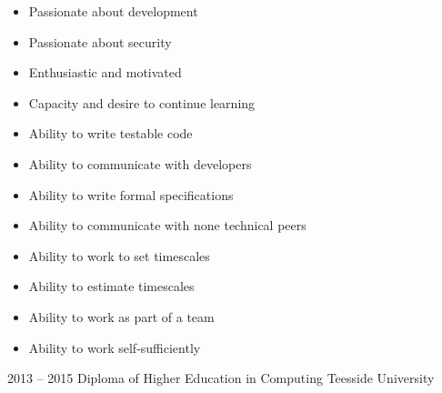 \documentclass[9pt]{developercv} %
\begin{document}
\begin{minipage}[t]{0.5\textwidth} %
    \vspace{-\baselineskip} %
    \vspace{10mm}
    \begin{itemize}
        \item Passionate about development
        \item Passionate about security
        \item Enthusiastic and motivated 
        \item Capacity and desire to continue learning
        \item Ability to write testable code
        \item Ability to communicate with developers
    \end{itemize}
\end{minipage}
\begin{minipage}[t]{0.5\textwidth} %
    \vspace{5mm}
    \begin{itemize}
        \item Ability to write formal specifications 
        \item Ability to communicate with none technical peers
        \item Ability to work to set timescales
        \item Ability to estimate timescales 
        \item Ability to work as part of a team
        \item Ability to work self-sufficiently
    \end{itemize}
\end{minipage}

\vspace{10mm}



\begin{entrylist}
    \entry
    {2013 -- 2015}
    {Diploma of Higher Education in Computing}
    {Teesside University}
    {}
\end{entrylist}
\end{document}
